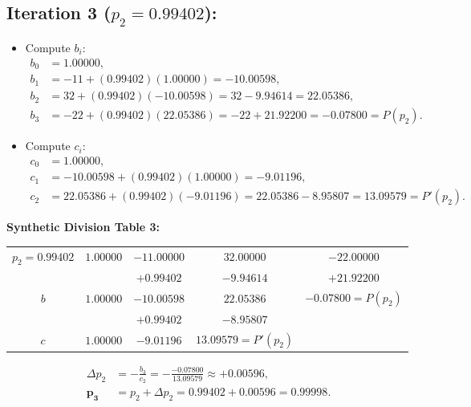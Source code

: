 \documentclass[11pt,a4paper]{article}
\begin{document}
\subsection*{Iteration 3 ($p_2 = 0.99402$):}
\begin{itemize}
    \item Compute $b_i$:
    \begin{align*}
    b_0 &= 1.00000, \\
    b_1 &= -11 + (0.99402)(1.00000) = -10.00598, \\
    b_2 &= 32 + (0.99402)(-10.00598) = 32 - 9.94614 = 22.05386, \\
    b_3 &= -22 + (0.99402)(22.05386) = -22 + 21.92200 = \mathbf{-0.07800} = P(p_2).
    \end{align*}
    \item Compute $c_i$:
    \begin{align*}
    c_0 &= 1.00000, \\
    c_1 &= -10.00598 + (0.99402)(1.00000) = -9.01196, \\
    c_2 &= 22.05386 + (0.99402)(-9.01196) = 22.05386 - 8.95807 = \mathbf{13.09579} = P'(p_2).
    \end{align*}
\end{itemize}

\noindent\textbf{Synthetic Division Table 3:}
\begin{center}
\begin{tabular}{c|cccc}
$p_2 = 0.99402$ & $1.00000$ & $-11.00000$ & $32.00000$ & $-22.00000$ \\
& & $+0.99402$ & $-9.94614$ & $+21.92200$ \\
\midrule
$b$ & $1.00000$ & $-10.00598$ & $22.05386$ & $\mathbf{-0.07800} = P(p_2)$ \\
& & $+0.99402$ & $-8.95807$ & \\
\midrule
$c$ & $1.00000$ & $-9.01196$ & $\mathbf{13.09579} = P'(p_2)$ & \\
\bottomrule
\end{tabular}
\end{center}

\begin{align*}
\Delta p_2 &= -\frac{b_3}{c_2} = -\frac{-0.07800}{13.09579} \approx +0.00596, \\
\mathbf{p_3} &= p_2 + \Delta p_2 = 0.99402 + 0.00596 = \mathbf{0.99998}.
\end{align*}
\end{document}
